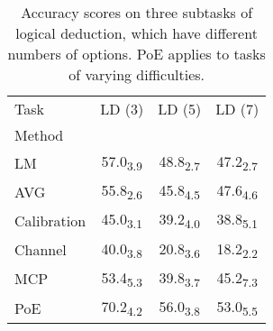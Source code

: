 \begin{table}[h]
\centering
\caption{Accuracy scores on three subtasks of logical deduction, which have different numbers of options. PoE applies to tasks of varying difficulties.}
\label{tab:num_option}
\begin{tabular}{l|c|c|c}
Task & LD (3) & LD (5) & LD (7) \\
Method &  &  &  \\
LM & 57.0\textsubscript{3.9} & 48.8\textsubscript{2.7} & 47.2\textsubscript{2.7} \\
AVG & 55.8\textsubscript{2.6} & 45.8\textsubscript{4.5} & 47.6\textsubscript{4.6} \\
Calibration & 45.0\textsubscript{3.1} & 39.2\textsubscript{4.0} & 38.8\textsubscript{5.1} \\
Channel & 40.0\textsubscript{3.8} & 20.8\textsubscript{3.6} & 18.2\textsubscript{2.2} \\
MCP & 53.4\textsubscript{5.3} & 39.8\textsubscript{3.7} & 45.2\textsubscript{7.3} \\
PoE & 70.2\textsubscript{4.2} & 56.0\textsubscript{3.8} & 53.0\textsubscript{5.5} \\
\end{tabular}
\end{table}

